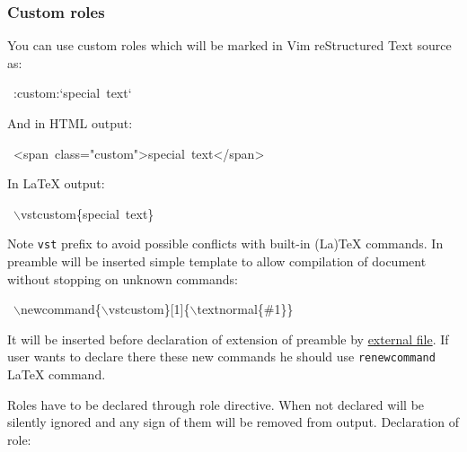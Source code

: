 \documentclass[12pt]{article}
\begin{document}
\hypertarget{lcustom-roles}{}
\subsubsection{Custom roles}

You can use custom roles which will be marked in Vim reStructured Text source as:

\begin{ttfamily}\begin{flushleft}
\mbox{~:custom:`special~text`}\\
\end{flushleft}\end{ttfamily}

And in HTML output:

\begin{ttfamily}\begin{flushleft}
\mbox{~<span~class="custom">special~text</span>}\\
\end{flushleft}\end{ttfamily}

In \LaTeX{} output:

\begin{ttfamily}\begin{flushleft}
\mbox{~$\backslash$vstcustom\{special~text\}}\\
\end{flushleft}\end{ttfamily}

Note \texttt{vst} prefix to avoid possible conflicts with built-in (La)\TeX{}
commands. In preamble will be inserted simple template to allow compilation of
document without stopping on unknown commands:

\begin{ttfamily}\begin{flushleft}
\mbox{~$\backslash$newcommand\{$\backslash$vstcustom\}[1]\{$\backslash$textnormal\{\#1\}\}}\\
\end{flushleft}\end{ttfamily}

It will be inserted before declaration of extension of preamble by \href{\#lvtp}{external
file}. If user wants to declare there these new commands he should
use \texttt{renewcommand} \LaTeX{} command.

Roles have to be declared through \hypertarget{lrole-directive}{role directive}. When not declared will be
silently ignored and any sign of them will be removed from output. Declaration
of role:
\end{document}
